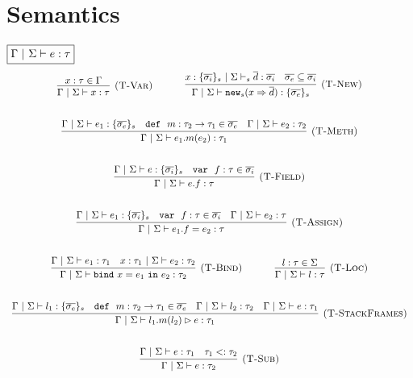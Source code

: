 \documentclass{llncs}
\newcommand{\keywadj}[1]{\mathtt{#1}}
\newcommand{\keyw}[1]{\keywadj{#1}~}
\begin{document}
\newpage

\section{Semantics}

$\fbox{$\Gamma~|~\Sigma \vdash e : \tau$}$
\[
\begin{array}{c}
\infer[\textsc{(T-Var)}]
  {\Gamma~|~\Sigma \vdash x : \tau}
  {x : \tau \in \Gamma}%
~~~~~~~~~~
\infer[\textsc{(T-New)}]
	{\Gamma~|~\Sigma \vdash \keywadj{new}_{s}(x \Rightarrow \overline{d}) : \{ \overline{\sigma_e} \}_{s}}
	{x : \{ \overline{\sigma_i} \}_{s}~|~\Sigma \vdash_s \overline{d} : \overline{\sigma_i} & \overline{\sigma_e} \subseteq \overline{\sigma_i}} \\[5ex]

\infer[\textsc{(T-Meth)}]
	{\Gamma~|~\Sigma \vdash e_1.m(e_2) : \tau_1} 
	{\Gamma~|~\Sigma \vdash e_1 : \{ \overline{\sigma_e} \}_s  & \keyw{def}~ m : \tau_2 \rightarrow \tau_1 \in \overline{\sigma_e} & \Gamma~|~\Sigma \vdash e_2 : \tau_2}\\[5ex]

\infer[\textsc{(T-Field)}]
	{\Gamma~|~\Sigma \vdash  e.f : \tau} 
	{\Gamma~|~\Sigma \vdash e : \{ \overline{\sigma_i} \}_s & \keyw{var}~ f : \tau \in \overline{\sigma_i}}\\[5ex]
	
\infer[\textsc{(T-Assign)}]
	{\Gamma~|~\Sigma \vdash  e_1.f=e_2 : \tau} 
	{\Gamma~|~\Sigma \vdash e_1 : \{ \overline{\sigma_i} \}_s & \keyw{var}~ f : \tau \in \overline{\sigma_i} & \Gamma~|~\Sigma \vdash e_2 : \tau}\\[5ex]

\infer[\textsc{(T-Bind)}]
  {\Gamma~|~\Sigma \vdash \keyw{bind} x = e_1~\keyw{in} e_2 : \tau_2}
  {\Gamma~|~\Sigma \vdash e_1 : \tau_1 & x : \tau_1~|~\Sigma \vdash e_2 : \tau_2}%
~~~~~~~~~~
\infer[\textsc{(T-Loc)}]
  {\Gamma~|~\Sigma \vdash l : \tau}
  {l : \tau \in \Sigma}\\[5ex]

\infer[\textsc{(T-StackFrames)}]
	{\Gamma~|~\Sigma \vdash l_1.m(l_2) \rhd e : \tau_1}
	{\Gamma~|~\Sigma \vdash l_1 : \{ \overline{\sigma_e} \}_s & \keyw{def}~ m : \tau_2 \rightarrow \tau_1 \in \overline{\sigma_e} & \Gamma~|~\Sigma \vdash l_2 : \tau_2 & \Gamma~|~\Sigma \vdash e : \tau_1} \\[5ex]

\infer[\textsc{(T-Sub)}]
  {\Gamma~|~\Sigma \vdash e : \tau_2}
  {\Gamma~|~\Sigma \vdash e : \tau_1 & \tau_1 <: \tau_2}\\[5ex]

\end{array}
\]
\end{document}
